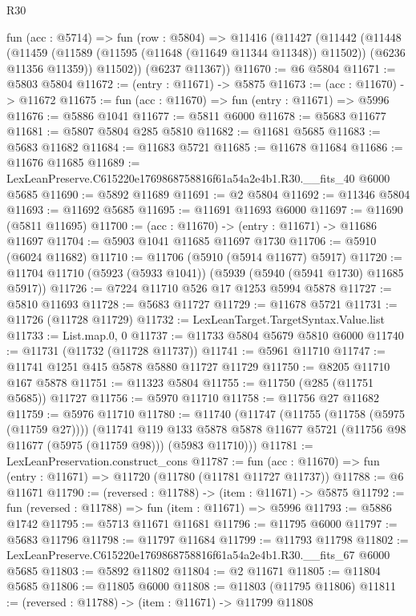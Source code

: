 \begin{lexlean}{R30}
\begin{coremodule}
  fun (acc : @5714) =>
  fun (row : @5804) =>
  @11416
    (@11427
      (@11442
        (@11448
          (@11459 (@11589 (@11595 (@11648 (@11649 @11344 @11348)) @11502)) (@6236 @11356 @11359))
          @11502))
      (@6237 @11367))
@11670 := @6 @5804
@11671 := @5803 @5804
@11672 := (entry : @11671) -> @5875
@11673 := (acc : @11670) -> @11672
@11675 := fun (acc : @11670) => fun (entry : @11671) => @5996
@11676 := @5886 @1041
@11677 := @5811 @6000
@11678 := @5683 @11677
@11681 := @5807 @5804 @285 @5810
@11682 := @11681 @5685
@11683 := @5683 @11682
@11684 := @11683 @5721
@11685 := @11678 @11684
@11686 := @11676 @11685
@11689 := LexLeanPreserve.C615220e1769868758816f61a54a2e4b1.R30.__fits_40 @6000 @5685
@11690 := @5892 @11689
@11691 := @2 @5804
@11692 := @11346 @5804
@11693 := @11692 @5685
@11695 := @11691 @11693 @6000
@11697 := @11690 (@5811 @11695)
@11700 := (acc : @11670) -> (entry : @11671) -> @11686 @11697
@11704 := @5903 @1041 @11685 @11697 @1730
@11706 := @5910 (@6024 @11682)
@11710 := @11706 (@5910 (@5914 @11677) @5917)
@11720 := @11704 @11710 (@5923 (@5933 @1041)) (@5939 (@5940 (@5941 @1730) @11685 @5917))
@11726 := @7224 @11710 @526 @17 @1253 @5994 @5878
@11727 := @5810 @11693
@11728 := @5683 @11727
@11729 := @11678 @5721
@11731 := @11726 (@11728 @11729)
@11732 := LexLeanTarget.TargetSyntax.Value.list
@11733 := List.map.{0, 0}
@11737 := @11733 @5804 @5679 @5810 @6000
@11740 := @11731 (@11732 (@11728 @11737))
@11741 := @5961 @11710
@11747 := @11741 @1251 @415 @5878 @5880 @11727 @11729
@11750 := @8205 @11710 @167 @5878
@11751 := @11323 @5804
@11755 := @11750 (@285 (@11751 @5685)) @11727
@11756 := @5970 @11710
@11758 := @11756 @27 @11682
@11759 := @5976 @11710
@11780 := @11740
    (@11747
      (@11755 (@11758 (@5975 (@11759 @27))))
      (@11741
        @119
        @133
        @5878
        @5878
        @11677
        @5721
        (@11756 @98 @11677 (@5975 (@11759 @98)))
        (@5983 @11710)))
@11781 := LexLeanPreservation.construct_cons
@11787 := fun (acc : @11670) => fun (entry : @11671) => @11720 (@11780 (@11781 @11727 @11737))
@11788 := @6 @11671
@11790 := (reversed : @11788) -> (item : @11671) -> @5875
@11792 := fun (reversed : @11788) => fun (item : @11671) => @5996
@11793 := @5886 @1742
@11795 := @5713 @11671 @11681
@11796 := @11795 @6000
@11797 := @5683 @11796
@11798 := @11797 @11684
@11799 := @11793 @11798
@11802 := LexLeanPreserve.C615220e1769868758816f61a54a2e4b1.R30.__fits_67 @6000 @5685
@11803 := @5892 @11802
@11804 := @2 @11671
@11805 := @11804 @5685
@11806 := @11805 @6000
@11808 := @11803 (@11795 @11806)
@11811 := (reversed : @11788) -> (item : @11671) -> @11799 @11808

\end{coremodule}
\end{lexlean}
